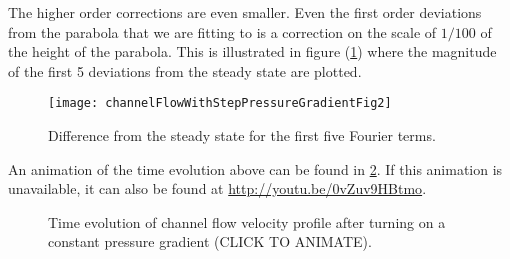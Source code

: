 The higher order corrections are even smaller.  Even the first order deviations from the parabola that we are fitting to is a correction on the scale of $1/100$ of the height of the parabola.  This is illustrated in figure (\ref{fig:channelFlowWithStepPressureGradient:channelFlowWithStepPressureGradientFig2}) where the magnitude of the first 5 deviations from the steady state are plotted.

\begin{figure}[htp]
   \centering
   \texttt{[image: channelFlowWithStepPressureGradientFig2]}
   \caption{Difference from the steady state for the first five Fourier terms.}
   \label{fig:channelFlowWithStepPressureGradient:channelFlowWithStepPressureGradientFig2}
\end{figure}

An animation of the time evolution above can be found in \ref{fig:channelFlowWithStepPressureGradient:channelFlowWithStepPressureGradientAnimation1}.  If this animation is unavailable, it can also be found at \href{http://youtu.be/0vZuv9HBtmo}{http://youtu.be/0vZuv9HBtmo}.

\begin{figure}[htp]
   \centering
   \caption{Time evolution of channel flow velocity profile after turning on a constant pressure gradient (CLICK TO ANIMATE).}
   \label{fig:channelFlowWithStepPressureGradient:channelFlowWithStepPressureGradientAnimation1}
\end{figure}


\EndArticle
